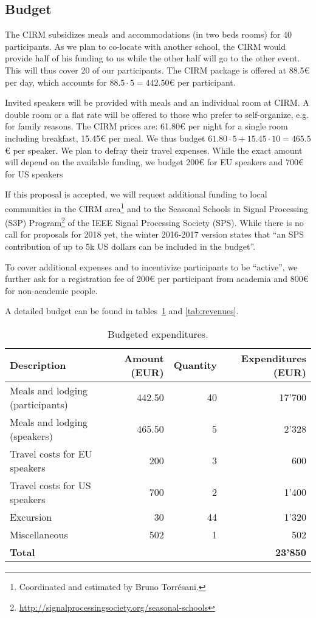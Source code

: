 \documentclass[a4paper]{scrartcl}
\begin{document}
\subsection{Budget}

The CIRM subsidizes meals and accommodations (in two beds rooms) for 40
participants. As we plan to co-locate with another school, the CIRM would
provide half of his funding to us while the other half will go to the other
event. This will thus cover 20 of our participants. The CIRM package is offered
at 88.5€ per day, which accounts for $88.5 \cdot 5 = 442.50$€ per participant.

Invited speakers will be provided with meals and an individual room at CIRM. A
double room or a flat rate will be offered to those who prefer to self-organize,
e.g. for family reasons. The CIRM prices are: 61.80€ per night for a single room
including breakfast, 15.45€ per meal. We thus budget $61.80 \cdot 5 + 15.45
\cdot 10 = 465.5$€ per speaker. We plan to defray their travel expenses. While
the exact amount will depend on the available funding, we budget 200€ for EU
speakers and 700€ for US speakers

If this proposal is accepted, we will request additional funding to local
communities in the CIRM area\footnote{Coordinated and estimated by Bruno
Torrésani.} and to the Seasonal Schools in Signal Processing (S3P)
Program\footnote{\url{http://signalprocessingsociety.org/seasonal-schools}} of
the IEEE Signal Processing Society (SPS). While there is no call for proposals
for 2018 yet, the winter 2016-2017 version states that ``an SPS contribution of
up to 5k US dollars can be included in the budget''.

To cover additional expenses and to incentivize participants to be ``active'',
we further ask for a registration fee of 200€ per participant from academia and
800€ for non-academic people.

A detailed budget can be found in tables~\ref{tab:expenditures} and
\ref{tab:revenues}.

\begin{table}[ht]
	\centering
	\begin{tabular}{|l|r|r|r|}
	\hline
	Description & Amount (EUR) & Quantity & Expenditures (EUR) \\
	\hline
	Meals and lodging (participants) &  442.50 & 40 & 17'700 \\
	Meals and lodging (speakers)     &  465.50 &  5 &  2'328 \\
	Travel costs for EU speakers     &  200    &  3 &    600 \\
	Travel costs for US speakers     &  700    &  2 &  1'400 \\
	Excursion                        &   30    & 44 &  1'320 \\
	Miscellaneous                    &  502    &  1 &    502 \\
	\hline
	\multicolumn{3}{|l|}{\textbf{Total}} & \textbf{23'850} \\
	\hline
	\end{tabular}
	\caption{Budgeted expenditures.}
	\label{tab:expenditures}
\end{table}
\end{document}
